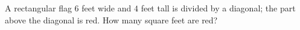 A rectangular flag $6$ feet wide and $4$ feet tall is divided by a diagonal; the part above the diagonal is red. How many square feet are red?
